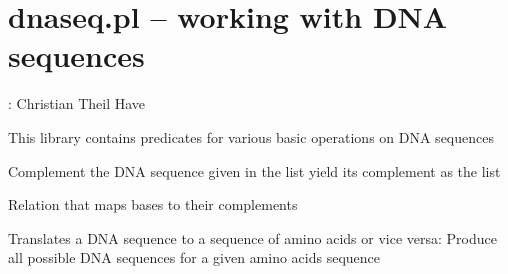 


\section{dnaseq.pl -- working with DNA sequences}

\label{sec:dnaseq}

\begin{tags}
: Christian Theil Have

This library contains predicates for various basic operations on DNA sequences
\end{tags}

\vspace{0.7cm}

\begin{description}
Complement the DNA sequence given in the list  yield its complement as the list 

Relation that maps bases to their complements

Translates a DNA sequence to a sequence of amino acids
or vice versa: Produce all possible DNA sequences for
a given amino acids sequence
\end{description}

